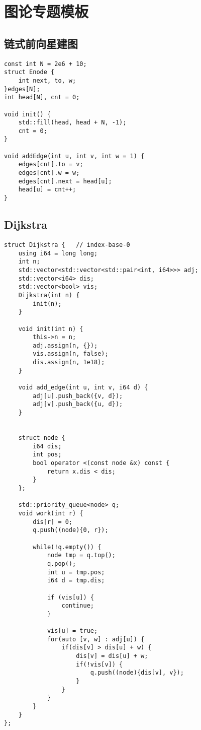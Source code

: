 \section{图论专题模板}
\subsection{链式前向星建图}
\begin{lstlisting}
const int N = 2e6 + 10;
struct Enode {
    int next, to, w;
}edges[N];
int head[N], cnt = 0;

void init() {
    std::fill(head, head + N, -1);
    cnt = 0;
}

void addEdge(int u, int v, int w = 1) {
    edges[cnt].to = v;
    edges[cnt].w = w;
    edges[cnt].next = head[u];
    head[u] = cnt++;
}
\end{lstlisting}



\subsection{Dijkstra}
\begin{lstlisting}
struct Dijkstra {   // index-base-0
    using i64 = long long;
    int n;
    std::vector<std::vector<std::pair<int, i64>>> adj;
    std::vector<i64> dis;
    std::vector<bool> vis;
    Dijkstra(int n) {
        init(n);
    }

    void init(int n) {
        this->n = n;
        adj.assign(n, {});
        vis.assign(n, false);
        dis.assign(n, 1e18);
    }
 
    void add_edge(int u, int v, i64 d) {
        adj[u].push_back({v, d});
        adj[v].push_back({u, d});
    }
 

    struct node {
        i64 dis;
        int pos;
        bool operator <(const node &x) const {
            return x.dis < dis;
        }
    };
 
    std::priority_queue<node> q;
    void work(int r) {
        dis[r] = 0;
        q.push((node){0, r});
 
        while(!q.empty()) {
            node tmp = q.top();
            q.pop();
            int u = tmp.pos;
            i64 d = tmp.dis;
 
            if (vis[u]) {
                continue;
            }
 
            vis[u] = true;
            for(auto [v, w] : adj[u]) {
                if(dis[v] > dis[u] + w) {
                    dis[v] = dis[u] + w;
                    if(!vis[v]) {
                        q.push((node){dis[v], v});
                    }
                }
            }
        }
    }
};
\end{lstlisting}

